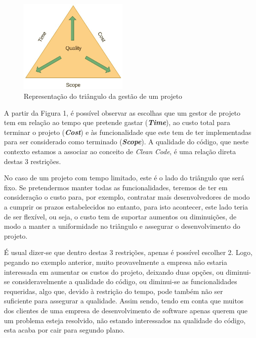 \documentclass[10pt,portuguese]{article}
\begin{document}
\begin{figure}[!h]
    \centering
    \includegraphics[width=200]{images/quality-triangle.jpg}
    \caption{Representação do triângulo da gestão de um projeto}
\end{figure}

\Par A partir da Figura 1, é possível observar as escolhas que um gestor de projeto tem em relação ao tempo que pretende gastar (\textbf{\textit{Time}}), ao custo total para terminar o projeto (\textbf{\textit{Cost}}) e às funcionalidade que este tem de ter implementadas para ser considerado como terminado (\textbf{\textit{Scope}}). A qualidade do código, que neste contexto estamos a associar ao conceito de \textit{Clean Code}, 
é uma relação direta destas 3 restrições.

\Par No caso de um projeto com tempo limitado, este é o lado do triângulo que será fixo. Se pretendermos manter todas as funcionalidades, teremos de ter em consideração o custo para, por exemplo, contratar mais desenvolvedores de modo a cumprir os prazos estabelecidos no entanto, para isto acontecer, este lado teria de ser flexível, ou seja, o custo tem de suportar aumentos ou diminuições, de modo a manter a uniformidade no triângulo e assegurar o desenvolvimento do projeto.

\Par É usual dizer-se que dentro destas 3 restrições, apenas é possível escolher 2. Logo, pegando no exemplo anterior, muito provavelmente a empresa não estaria interessada em aumentar os custos do projeto, deixando duas opções, ou diminui-se consideravelmente a qualidade do código, ou diminui-se as funcionalidades requeridas, algo que, devido à restrição do tempo, pode também não ser suficiente para assegurar a qualidade. Assim sendo, tendo em conta que muitos dos clientes de uma empresa de desenvolvimento de software apenas querem que um problema esteja resolvido, não estando interessados na qualidade do código, esta acaba por cair para segundo plano. 
\end{document}
